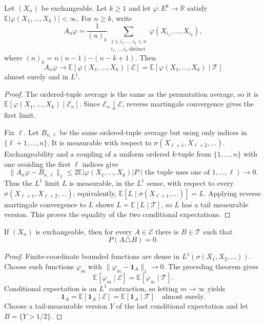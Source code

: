 \begin{thm}
Let $(X_n)$ be exchangeable. Let $k\geq1$ and let
$\varphi:E^k\to\mathbb R$ satisfy
$\mathbb E|\varphi(X_1,\ldots,X_k)|<\infty$. For $n\geq k$, write
\[
A_n\varphi
 =\frac1{(n)_k}
  \sum_{\substack{1\leq i_1,\ldots,i_k\leq n\\
                  i_1,\ldots,i_k\text{ distinct}}}
  \varphi(X_{i_1},\ldots,X_{i_k}),
\]
where $(n)_k=n(n-1)\cdots(n-k+1)$. Then
\[
A_n\varphi
 \longrightarrow
 \mathbb E[\varphi(X_1,\ldots,X_k)\mid\mathcal E]
 =\mathbb E[\varphi(X_1,\ldots,X_k)\mid\mathcal T]
\]
almost surely and in $L^1$.
\end{thm}

\begin{proof}
The ordered-tuple average is the same as the permutation average, so it is
$\mathbb E[\varphi(X_1,\ldots,X_k)\mid\mathcal E_n]$. Since
$\mathcal E_n\downarrow\mathcal E$, reverse martingale convergence gives the
first limit.

Fix $\ell$. Let $B_{n,\ell}$ be the same ordered-tuple average but using only
indices in $\{\ell+1,\ldots,n\}$. It is measurable with respect to
$\sigma(X_{\ell+1},X_{\ell+2},\ldots)$. Exchangeability and a coupling of a
uniform ordered $k$-tuple from $\{1,\ldots,n\}$ with one avoiding the first
$\ell$ indices give
\[
\|A_n\varphi-B_{n,\ell}\|_1
 \leq2\mathbb E|\varphi(X_1,\ldots,X_k)|
      P(\text{the tuple uses one of }1,\ldots,\ell)
 \longrightarrow0.
\]
Thus the $L^1$ limit $L$ is measurable, in the $L^1$ sense, with respect to
every $\sigma(X_{\ell+1},X_{\ell+2},\ldots)$; equivalently,
$\mathbb E[L\mid\sigma(X_{\ell+1},\ldots)]=L$. Applying reverse martingale
convergence to $L$ shows $L=\mathbb E[L\mid\mathcal T]$, so $L$ has a tail
measurable version. This proves the equality of the two conditional
expectations.
\end{proof}

\begin{thm}
If $(X_n)$ is exchangeable, then for every $A\in\mathcal E$ there is
$B\in\mathcal T$ such that
\[
P(A\triangle B)=0.
\]
\end{thm}

\begin{proof}
Finite-coordinate bounded functions are dense in
$L^1(\sigma(X_1,X_2,\ldots))$. Choose such functions $\varphi_m$ with
$\|\varphi_m-\mathbf1_A\|_1\to0$. The preceding theorem gives
\[
\mathbb E[\varphi_m\mid\mathcal E]
 =\mathbb E[\varphi_m\mid\mathcal T].
\]
Conditional expectation is an $L^1$ contraction, so letting $m\to\infty$
yields
\[
\mathbf1_A
 =\mathbb E[\mathbf1_A\mid\mathcal E]
 =\mathbb E[\mathbf1_A\mid\mathcal T]
\quad\text{almost surely}.
\]
Choose a tail-measurable version $Y$ of the last conditional expectation and
let $B=\{Y>1/2\}$.
\end{proof}

